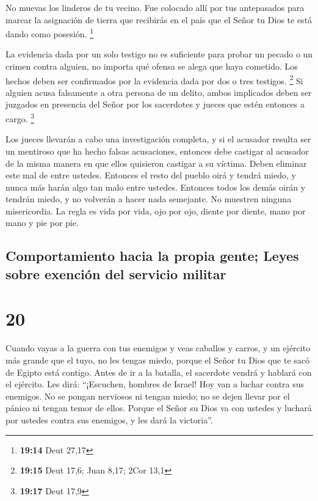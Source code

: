  No muevas los linderos de tu vecino. Fue colocado allí
por tus antepasados para marcar la asignación de tierra que recibirás en
el país que el Señor tu Dios te está dando como posesión. \footnote{\textbf{19:14}
  Deut 27,17}

 La evidencia dada por un solo testigo no es suficiente
para probar un pecado o un crimen contra alguien, no importa qué ofensa
se alega que haya cometido. Los hechos deben ser confirmados por la
evidencia dada por dos o tres testigos. \footnote{\textbf{19:15} Deut
  17,6; Juan 8,17; 2Cor 13,1}  Si alguien acusa
falsamente a otra persona de un delito,  ambos implicados
deben ser juzgados en presencia del Señor por los sacerdotes y jueces
que estén entonces a cargo. \footnote{\textbf{19:17} Deut 17,9}

 Los jueces llevarán a cabo una investigación completa, y
si el acusador resulta ser un mentiroso que ha hecho falsas acusaciones,
 entonces debe castigar al acusador de la misma manera en
que ellos quisieron castigar a su víctima. Deben eliminar este mal de
entre ustedes.  Entonces el resto del pueblo oirá y
tendrá miedo, y nunca más harán algo tan malo entre ustedes. Entonces
todos los demás oirán y tendrán miedo, y no volverán a hacer nada
semejante.  No muestren ninguna misericordia. La regla es
vida por vida, ojo por ojo, diente por diente, mano por mano y pie por
pie.

\hypertarget{comportamiento-hacia-la-propia-gente-leyes-sobre-exenciuxf3n-del-servicio-militar}{%
\subsection{Comportamiento hacia la propia gente; Leyes sobre exención
del servicio
militar}\label{comportamiento-hacia-la-propia-gente-leyes-sobre-exenciuxf3n-del-servicio-militar}}

\hypertarget{section-19}{%
\section{20}\label{section-19}}

 Cuando vayas a la guerra con tus enemigos y veas caballos
y carros, y un ejército más grande que el tuyo, no les tengas miedo,
porque el Señor tu Dios que te sacó de Egipto está contigo.
 Antes de ir a la batalla, el sacerdote vendrá y hablará
con el ejército.  Les dirá: ``¡Escuchen, hombres de
Israel! Hoy van a luchar contra sus enemigos. No se pongan nerviosos ni
tengan miedo; no se dejen llevar por el pánico ni tengan temor de ellos.
 Porque el Señor su Dios va con ustedes y luchará por
ustedes contra sus enemigos, y les dará la victoria''.

